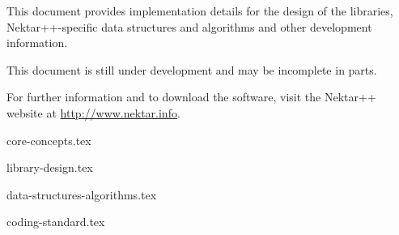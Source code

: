 \documentclass[
a4paper, %
11pt, %
onecolumn, %
openany, %
]{memoir}
\begin{document}
This document provides implementation details for the design of the libraries,
Nektar++-specific data structures and algorithms and other development
information.

\begin{warningbox}
This document is still under development and may be incomplete in parts.
\end{warningbox}

For further information and to download the software, visit the Nektar++ website
at \url{http://www.nektar.info}.

\mainmatter

{core-concepts.tex}

{library-design.tex}

{data-structures-algorithms.tex}

{coding-standard.tex}



\backmatter





\printindex
\end{document}
